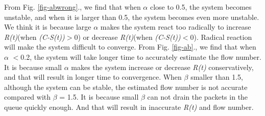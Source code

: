 From Fig. \ref{fig-abwrong}., we find that when $\alpha$ close to 0.5, the system becomes unstable, and when it is larger than 0.5, the system becomes even more unstable. We think it is because large $\alpha$ makes the system react too radically to increase \emph{R(t)}(when \emph{(C-S(t))}$>$0) or decrease \emph{R(t)}(when \emph{(C-S(t))}$<$0). Radical reaction will make the system difficult to converge. From Fig. \ref{fig-ab}., we find that when $\alpha$ $<$0.2, the system will take longer time to accurately estimate the flow number. It is because small $\alpha$ makes the system increase or decrease \emph{R(t)} conservatively, and that will result in longer time to convergence. When $\beta$ smaller than 1.5, although the system can be stable, the estimated flow number is not accurate compared with $\beta$ = 1.5. It is because small $\beta$ can not drain the packets in the queue quickly enough. And that will result in inaccurate \emph{R(t)} and flow number.

